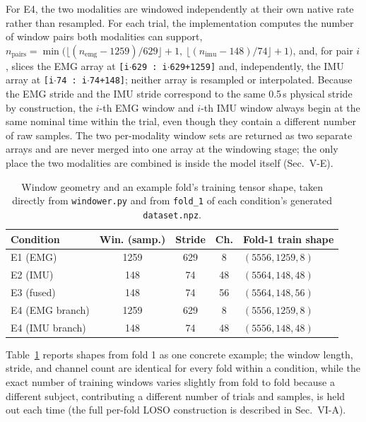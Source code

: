 \documentclass[conference]{IEEEtran}
\begin{document}
For E4, the two modalities are windowed independently at their own
native rate rather than resampled. For each trial, the implementation
computes the number of window pairs both modalities can support,
$n_{\text{pairs}} = \min\!\big(\lfloor (n_{\text{emg}} -
1259)/629\rfloor + 1,\ \lfloor (n_{\text{imu}} - 148)/74\rfloor +
1\big)$, and, for pair $i$, slices the EMG array at
\texttt{[i$\cdot$629 : i$\cdot$629+1259]} and, independently, the
IMU array at \texttt{[i$\cdot$74 : i$\cdot$74+148]}; neither array is
resampled or interpolated. Because the EMG stride and the IMU
stride correspond to the same 0.5\,s physical stride by construction,
the $i$-th EMG window and $i$-th IMU window always begin at the same
nominal time within the trial, even though they contain a different
number of raw samples. The two per-modality window sets are returned
as two separate arrays and are never merged into one array at the
windowing stage; the only place the two modalities are combined is
inside the model itself (Sec.~V-E).

\begin{table}[t]
\centering
\caption{Window geometry and an example fold's training tensor
shape, taken directly from \texttt{windower.py} and from
\texttt{fold\_1} of each condition's generated \texttt{dataset.npz}.}
\label{tab:window-geometry}
\begin{tabular}{lcccl}
\toprule
Condition & Win. (samp.) & Stride & Ch. & Fold-1 train shape \\
\midrule
E1 (EMG)        & 1259 & 629 & 8  & $(5556,1259,8)$ \\
E2 (IMU)        & 148  & 74  & 48 & $(5564,148,48)$ \\
E3 (fused)      & 148  & 74  & 56 & $(5564,148,56)$ \\
E4 (EMG branch) & 1259 & 629 & 8  & $(5556,1259,8)$ \\
E4 (IMU branch) & 148  & 74  & 48 & $(5556,148,48)$ \\
\bottomrule
\end{tabular}
\end{table}

Table~\ref{tab:window-geometry} reports shapes from fold 1 as one
concrete example; the window length, stride, and channel count are
identical for every fold within a condition, while the exact number
of training windows varies slightly from fold to fold because a
different subject, contributing a different number of trials and
samples, is held out each time (the full per-fold LOSO construction
is described in Sec.~VI-A).
\end{document}
